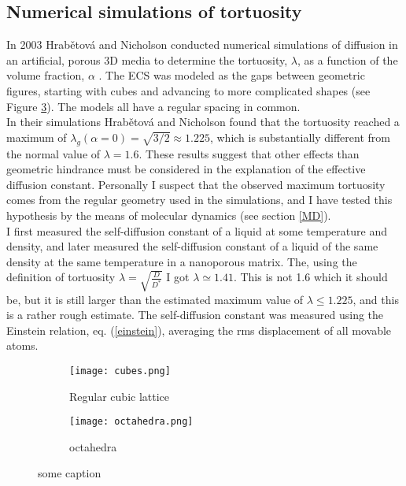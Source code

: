 \documentclass[a4paper,english, 12pt, twoside]{article}
\begin{document}
\subsection{Numerical simulations of tortuosity}
In 2003 Hrab\v{e}tov\'{a} and Nicholson conducted numerical simulations of diffusion in an artificial, porous 3D media to determine the tortuosity, $\lambda$, as a function of the volume fraction, $\alpha$ \cite{hrabetova2004contribution}. 
The ECS was modeled as the gaps between geometric figures, starting with cubes and advancing to more complicated shapes (see Figure \ref{geometries}). 
The models all have a regular spacing in common. \\
In their simulations Hrab\v{e}tov\'{a} and Nicholson found that the tortuosity reached a maximum of $\lambda_g(\alpha=0) = \sqrt{3/2}\approx 1.225$, which is substantially different from the normal value of $\lambda = 1.6$. 
These results suggest that other effects than geometric hindrance must be considered in the explanation of the effective diffusion constant. 
Personally I suspect that the observed maximum tortuosity comes from the regular geometry used in the simulations, and I have tested this hypothesis by the means of molecular dynamics (see section \ref{MD}). \\
I first measured the self-diffusion constant of a liquid at some temperature and density, and later measured the self-diffusion constant of a liquid of the same density at the same temperature in a nanoporous matrix. 
The, using the definition of tortuosity $\lambda = \sqrt{\frac{D}{D^*}}$ I got $\lambda \simeq 1.41$. 
This is not 1.6 which it should be, but it is still larger than the estimated maximum value of $\lambda \leq 1.225$, and this is a rather rough estimate. 
The self-diffusion constant was measured using the Einstein relation, eq. (\ref{einstein}), averaging the rms displacement of all movable atoms.

\begin{figure}[H]
\centering
  \begin{subfigure}[b]{0.48\textwidth}
    \texttt{[image: cubes.png]}
    \caption{Regular cubic lattice}
    \label{geometries:cubes}
  \end{subfigure}
  \begin{subfigure}[b]{0.48\textwidth}
    \texttt{[image: octahedra.png]}
    \caption{octahedra}
    \label{geometries:octahedra}
  \end{subfigure}
  \caption{some caption}
  \label{geometries}
\end{figure}
\end{document}
